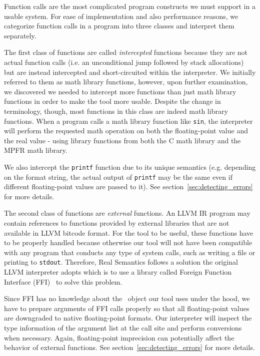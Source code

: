 Function calls are the most complicated program constructs we must support in a usable system. For ease of implementation and also performance reasons, we categorize function calls in a program into three classes and interpret them separately.

The first class of functions are called {\em intercepted} functions because they are not actual function calls (i.e. an unconditional jump followed by stack allocations) but are instead intercepted and short-circuited within the interpreter. We initially referred to them as math library functions, however, upon further examination, we discovered we needed to intercept more functions than just math library functions in order to make the tool more usable. Despite the change in terminology, though, most functions in this class are indeed math library functions. When a program calls a math library function like {\tt sin}, the interpreter will perform the requested math operation on both the floating-point value and the real value - using library functions from both the C math library and the MPFR math library.

We also intercept the \texttt{printf} function due to its unique semantics (e.g. depending on the format string, the actual output of \texttt{printf} may be the same even if different floating-point values are passed to it). See section~\ref{sec:detecting_errors} for more details.

The second class of functions are {\em external} functions. An LLVM IR program may contain references to functions provided by external libraries that are not available in LLVM bitcode format. For the tool to be useful, these functions have to be properly handled because otherwise our tool will not have been compatible with any program that conducts any type of system calls, such as writing a file or printing to {\tt stdout}. Therefore, Real Semantics follows a solution the original LLVM interpreter adopts which is to use a library called Foreign Function Interface (FFI)~\cite{ffi} to solve this problem.

Since FFI has no knowledge about the \smartfloat~object our tool uses under the hood, we have to prepare arguments of FFI calls properly so that all floating-point values are downgraded to native floating-point formats. Our interpreter will inspect the type information of the argument list at the call site and perform conversions when necessary. Again, floating-point imprecision can potentially affect the behavior of external functions. See section~\ref{sec:detecting_errors} for more details.

